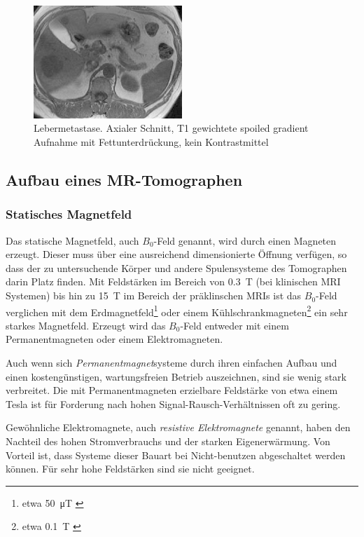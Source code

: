 \begin{figure}[H]
	\centering
	\includegraphics[width=0.5\textwidth]{img/metastase.png}
	\caption[Lebermetastase]{Lebermetastase. Axialer Schnitt, T1 gewichtete spoiled gradient Aufnahme mit Fettunterdrückung, kein Kontrastmittel \cite[S.~872]{Reiser2008}}
	\label{fig:metastase}
\end{figure}



\subsection{Aufbau eines MR-Tomographen}

\subsubsection{Statisches Magnetfeld}
Das statische Magnetfeld, auch $B_0$-Feld genannt, wird durch einen Magneten erzeugt. Dieser muss über eine ausreichend dimensionierte Öffnung verfügen, so dass der zu untersuchende Körper und andere Spulensysteme des Tomographen darin Platz finden. Mit Feldstärken im Bereich von \SI{0.3}{\tesla} (bei klinischen MRI Systemen) bis hin zu \SI{15}{\tesla} im Bereich der präklinschen MRIs ist das $B_0$-Feld verglichen mit dem Erdmagnetfeld\footnote{etwa \SI{50}{\micro\tesla} \cite{Enc1994}} oder einem Kühlschrankmagneten\footnote{etwa \SI{0.1}{\tesla} \cite{LHC2018}} ein sehr starkes Magnetfeld.
Erzeugt wird das $B_0$-Feld entweder mit einem Permanentmagneten oder einem Elektromagneten. 

Auch wenn sich \textit{Permanentmagnet}systeme durch ihren einfachen Aufbau und einen kostengünstigen, wartungsfreien Betrieb auszeichnen, sind sie wenig stark verbreitet. Die mit Permanentmagneten erzielbare Feldstärke von etwa einem Tesla ist für Forderung nach hohen Signal-Rausch-Verhältnissen oft zu gering.

Gewöhnliche Elektromagnete, auch \textit{resistive Elektromagnete} genannt, haben den Nachteil des hohen Stromverbrauchs und der starken Eigenerwärmung. Von Vorteil ist, dass Systeme dieser Bauart bei Nicht-benutzen abgeschaltet werden können. Für sehr hohe Feldstärken sind sie nicht geeignet.


